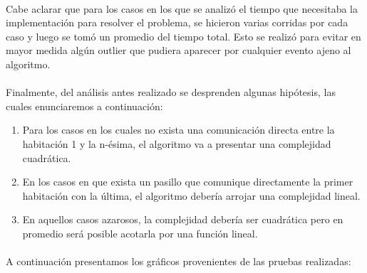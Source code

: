 \paragraph{}
Cabe aclarar que para los casos en los que se analizó el tiempo que necesitaba la implementación para resolver el problema, se hicieron varias corridas por cada caso y luego se tomó un promedio del tiempo total. Esto se realizó para evitar en mayor medida algún outlier que pudiera aparecer por cualquier evento ajeno al algoritmo.

\paragraph{}
Finalmente, del análisis antes realizado se desprenden algunas hipótesis, las cuales enunciaremos a continuación:
\begin{enumerate}
  \item Para los casos en los cuales no exista una comunicación directa entre la habitación 1 y la n-ésima, el algoritmo va a presentar una complejidad cuadrática.
  \item En los casos en que exista un pasillo que comunique directamente la primer habitación con la última, el algoritmo debería arrojar una complejidad lineal.
  \item En aquellos casos azarosos, la complejidad debería ser cuadrática pero en promedio será posible acotarla por una función lineal.
\end{enumerate}

\paragraph{}
A continuación presentamos los gráficos provenientes de las pruebas realizadas:

\clearpage

		

